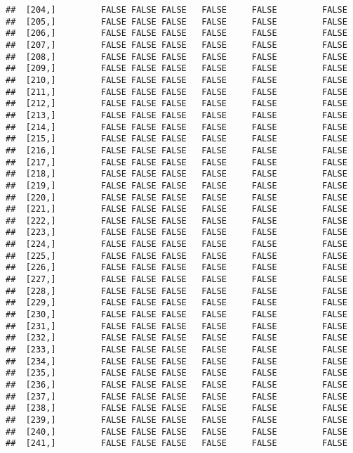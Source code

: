 \documentclass[
]{article}
\begin{document}
\begin{verbatim}
##  [204,]         FALSE FALSE FALSE   FALSE     FALSE         FALSE
##  [205,]         FALSE FALSE FALSE   FALSE     FALSE         FALSE
##  [206,]         FALSE FALSE FALSE   FALSE     FALSE         FALSE
##  [207,]         FALSE FALSE FALSE   FALSE     FALSE         FALSE
##  [208,]         FALSE FALSE FALSE   FALSE     FALSE         FALSE
##  [209,]         FALSE FALSE FALSE   FALSE     FALSE         FALSE
##  [210,]         FALSE FALSE FALSE   FALSE     FALSE         FALSE
##  [211,]         FALSE FALSE FALSE   FALSE     FALSE         FALSE
##  [212,]         FALSE FALSE FALSE   FALSE     FALSE         FALSE
##  [213,]         FALSE FALSE FALSE   FALSE     FALSE         FALSE
##  [214,]         FALSE FALSE FALSE   FALSE     FALSE         FALSE
##  [215,]         FALSE FALSE FALSE   FALSE     FALSE         FALSE
##  [216,]         FALSE FALSE FALSE   FALSE     FALSE         FALSE
##  [217,]         FALSE FALSE FALSE   FALSE     FALSE         FALSE
##  [218,]         FALSE FALSE FALSE   FALSE     FALSE         FALSE
##  [219,]         FALSE FALSE FALSE   FALSE     FALSE         FALSE
##  [220,]         FALSE FALSE FALSE   FALSE     FALSE         FALSE
##  [221,]         FALSE FALSE FALSE   FALSE     FALSE         FALSE
##  [222,]         FALSE FALSE FALSE   FALSE     FALSE         FALSE
##  [223,]         FALSE FALSE FALSE   FALSE     FALSE         FALSE
##  [224,]         FALSE FALSE FALSE   FALSE     FALSE         FALSE
##  [225,]         FALSE FALSE FALSE   FALSE     FALSE         FALSE
##  [226,]         FALSE FALSE FALSE   FALSE     FALSE         FALSE
##  [227,]         FALSE FALSE FALSE   FALSE     FALSE         FALSE
##  [228,]         FALSE FALSE FALSE   FALSE     FALSE         FALSE
##  [229,]         FALSE FALSE FALSE   FALSE     FALSE         FALSE
##  [230,]         FALSE FALSE FALSE   FALSE     FALSE         FALSE
##  [231,]         FALSE FALSE FALSE   FALSE     FALSE         FALSE
##  [232,]         FALSE FALSE FALSE   FALSE     FALSE         FALSE
##  [233,]         FALSE FALSE FALSE   FALSE     FALSE         FALSE
##  [234,]         FALSE FALSE FALSE   FALSE     FALSE         FALSE
##  [235,]         FALSE FALSE FALSE   FALSE     FALSE         FALSE
##  [236,]         FALSE FALSE FALSE   FALSE     FALSE         FALSE
##  [237,]         FALSE FALSE FALSE   FALSE     FALSE         FALSE
##  [238,]         FALSE FALSE FALSE   FALSE     FALSE         FALSE
##  [239,]         FALSE FALSE FALSE   FALSE     FALSE         FALSE
##  [240,]         FALSE FALSE FALSE   FALSE     FALSE         FALSE
##  [241,]         FALSE FALSE FALSE   FALSE     FALSE         FALSE

\end{verbatim}
\end{document}

